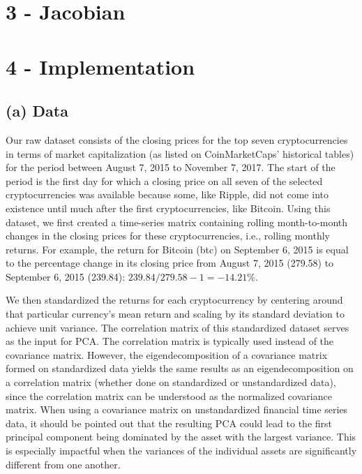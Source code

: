 \documentclass[12pt,twoside]{article}
\begin{document}
\section*{3 - Jacobian}

\section*{4 - Implementation}

\subsection*{(a) Data}

Our raw dataset consists of the closing prices for the top seven cryptocurrencies in terms of market capitalization (as listed on CoinMarketCaps' historical tables) for the period between August 7, 2015 to November 7, 2017. The start of the period is the first day for which a closing price on all seven of the selected cryptocurrencies was available because some, like Ripple, did not come into existence until much after the first cryptocurrencies, like Bitcoin. Using this dataset, we first created a time-series matrix containing rolling month-to-month changes in the closing prices for these cryptocurrencies, i.e., rolling monthly returns. For example, the return for Bitcoin (btc) on September 6, 2015 is equal to the percentage change in its closing price from August 7, 2015 (279.58) to September 6, 2015 (239.84): $239.84/279.58 - 1 = -14.21\%$.

\bigbreak
We then standardized the returns for each cryptocurrency by centering around that particular currency's mean return and scaling by its standard deviation to achieve unit variance. The correlation matrix of this standardized dataset serves as the input for PCA. The correlation matrix is typically used instead of the covariance matrix. However, the eigendecomposition of a covariance matrix formed on standardized data yields the same results as an eigendecomposition on a correlation matrix (whether done on standardized or unstandardized data), since the correlation matrix can be understood as the normalized covariance matrix. When using a covariance matrix on unstandardized financial time series data, it should be pointed out that the resulting PCA could lead to the first principal component being dominated by the asset with the largest variance. This is especially impactful when the variances of the individual assets are significantly different from one another.
\end{document}
